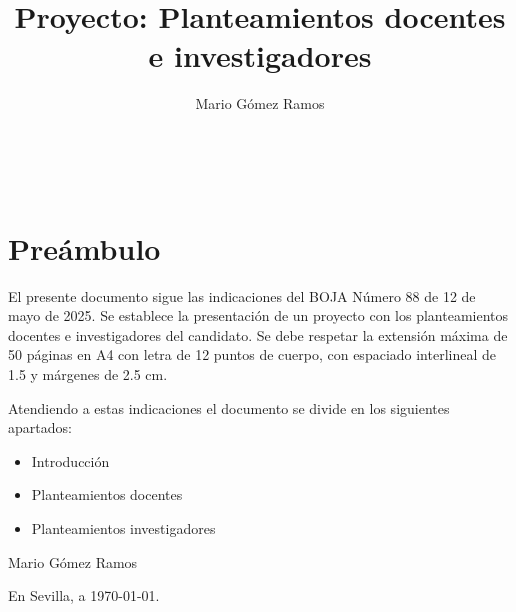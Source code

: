 \documentclass[a4paper,12pt,twoside]{article}
\begin{document}

\title{\textbf{Proyecto: Planteamientos docentes e investigadores}}
\author{Mario G\'omez Ramos}
\maketitle

\thispagestyle{empty}
\newpage
\thispagestyle{empty}  

~ \\


\newpage

\section*{Pre\'ambulo}

El presente documento sigue las indicaciones del BOJA Número 88 de 12 de mayo de 2025. Se establece la presentación de un proyecto con los planteamientos docentes e investigadores del candidato. Se debe respetar la extensión máxima de 50 páginas en A4 con letra de 12 puntos de cuerpo, con espaciado interlineal de 1.5 y márgenes de 2.5 cm.

Atendiendo a estas indicaciones el documento se divide en los siguientes apartados:

\begin{itemize}
\item Introducción
\item Planteamientos docentes
\item Planteamientos investigadores
\end{itemize}

\vfill


Mario G\'omez Ramos

En Sevilla, a \today.

~ \\

~ \\

~ \\


\newpage

~ \\
%
%
\newpage

\tableofcontents
\newpage

~ \\
\end{document}
